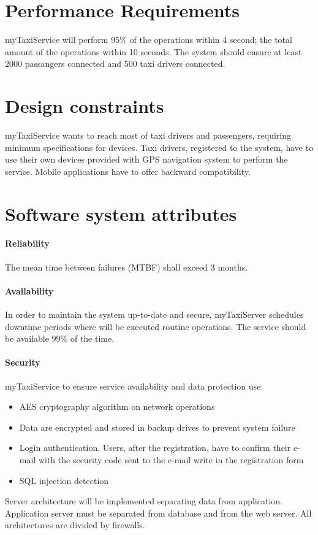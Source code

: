 \section{Performance Requirements}
myTaxiService will perform 95\% of the operations within 4 second; the total amount of the operations within 10 seconds.
The system should ensure at least 2000 passangers connected and 500 taxi drivers connected.

\section{Design constraints}
myTaxiService wants to reach most of taxi drivers and passengers, requiring minimum specifications for devices.
Taxi drivers, registered to the system, have to use their own devices provided with GPS navigation system to perform the service. Mobile applications have to offer backward compatibility.

\section{Software system attributes}
\paragraph{Reliability}
The mean time between failures (MTBF) shall exceed 3 months.
\paragraph{Availability}
In order to maintain the system up-to-date and secure, myTaxiServer schedules downtime periods where will be executed routine operations. The service should be available 99\% of the time.
\paragraph{Security}
myTaxiService to ensure service availability and data protection use:
\begin{itemize}
	\item AES cryptography algorithm on network operations
	\item Data are encrypted and stored in backup drives to prevent system failure
	\item Login authentication. Users, after the registration, have to confirm their e-mail with the security code sent to the e-mail write in the registration form
	\item SQL injection detection
\end{itemize}
Server architecture will be implemented separating
data from application. Application server must be separated
from database and from the web server. All architectures are divided by firewalls.
